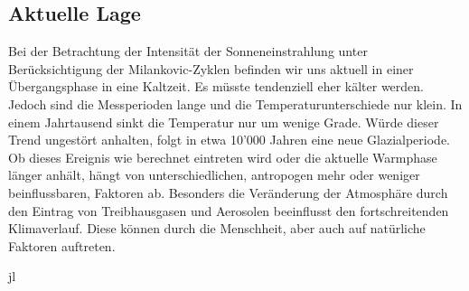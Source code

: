 \subsection{Aktuelle Lage
\label{milankovic:subsection:AktuelleLage}}
Bei der Betrachtung der Intensität der Sonneneinstrahlung unter Berücksichtigung der Milankovic-Zyklen befinden wir uns aktuell in einer Übergangsphase in eine Kaltzeit.
Es müsste tendenziell eher kälter werden.
Jedoch sind die Messperioden lange und die Temperaturunterschiede nur klein.
In einem Jahrtausend sinkt die Temperatur nur um wenige Grade.
Würde dieser Trend ungestört anhalten, folgt in etwa 10'000 Jahren eine neue Glazialperiode.
Ob dieses Ereignis wie berechnet eintreten wird oder die aktuelle Warmphase länger anhält, hängt von unterschiedlichen, antropogen mehr oder weniger beinflussbaren, Faktoren ab. Besonders die Veränderung der Atmosphäre durch den Eintrag von Treibhausgasen und Aerosolen beeinflusst den fortschreitenden Klimaverlauf.
Diese können durch die Menschheit, aber auch auf natürliche Faktoren auftreten.

jl

